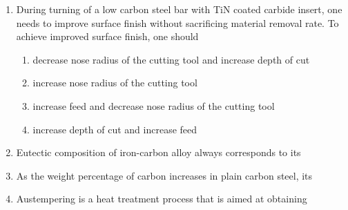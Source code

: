 \documentclass[journal,12pt,onecolumn]{IEEEtran}
\theoremstyle{remark}
\begin{document}
\begin{enumerate}
\item During turning of a low carbon steel bar with TiN coated carbide insert, one needs to improve surface finish without sacrificing material removal rate. To achieve improved surface finish, one should
\hfill{}
\begin{enumerate}
\item decrease nose radius of the cutting tool and increase depth of cut
\item increase nose radius of the cutting tool
\item increase feed and decrease nose radius of the cutting tool
\item increase depth of cut and increase feed
\end{enumerate}

\item Eutectic composition of iron-carbon alloy always corresponds to its
\hfill{}
\begin{enumerate}
\end{enumerate}

\item As the weight percentage of carbon increases in plain carbon steel, its
\hfill{}
\begin{enumerate}
\end{enumerate}

\item Austempering is a heat treatment process that is aimed at obtaining
\hfill{}
\begin{enumerate}
\end{enumerate}


\end{enumerate}
\end{document}
